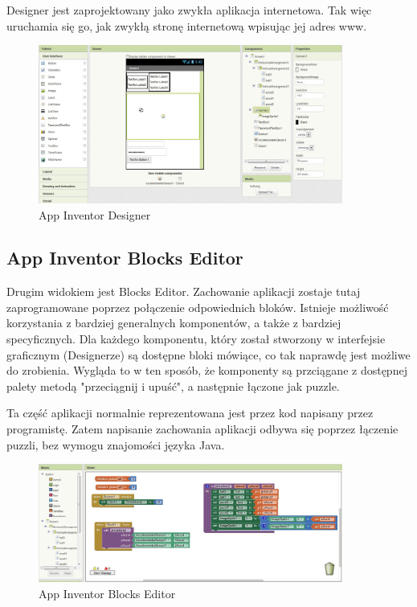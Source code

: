 Designer jest zaprojektowany jako zwykła aplikacja internetowa. Tak więc uruchamia się go, jak zwykłą stronę internetową wpisując jej adres www.

\begin{figure}[th] 
\centering\includegraphics[width=10cm]{figures/designer}
\caption{App Inventor Designer}
\end{figure}

\subsection{App Inventor Blocks Editor}
\label{c222}

Drugim widokiem jest Blocks Editor. Zachowanie aplikacji zostaje tutaj zaprogramowane poprzez połączenie odpowiednich bloków. Istnieje możliwość korzystania z bardziej generalnych komponentów, a także z bardziej specyficznych. Dla każdego komponentu, który został stworzony w interfejsie graficznym (Designerze) są dostępne bloki mówiące, co tak naprawdę jest możliwe do zrobienia. Wygląda to w ten sposób, że komponenty są przciągane z dostępnej palety metodą "przeciągnij i upuść", a następnie łączone jak puzzle.

Ta część aplikacji normalnie reprezentowana jest przez kod napisany przez programistę. Zatem napisanie zachowania aplikacji odbywa się poprzez łączenie puzzli, bez wymogu znajomości języka Java.

\begin{figure}[H] 
\centering\includegraphics[width=10cm]{figures/editor}
\caption{App Inventor Blocks Editor}
\end{figure}

